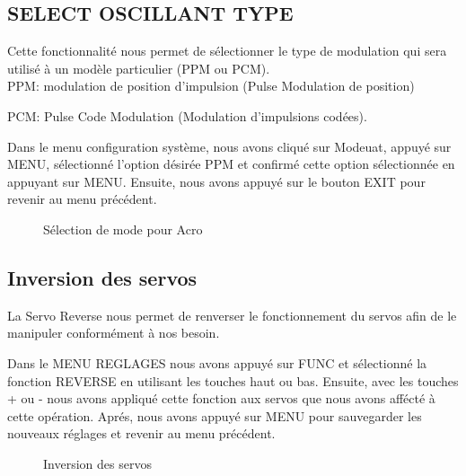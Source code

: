 \documentclass[a4paper,12pt]{book}
\begin{document}
\subsection{ SELECT OSCILLANT TYPE}
Cette fonctionnalité nous permet de sélectionner le type de modulation qui sera utilisé à un modèle particulier (PPM ou PCM).\\


PPM: modulation de position d'impulsion (Pulse Modulation de position) 

PCM: Pulse Code Modulation (Modulation d'impulsions codées).


Dans le menu configuration système, nous avons cliqué sur Modeuat, appuyé sur MENU, sélectionné l'option désirée PPM et confirmé cette option sélectionnée en appuyant sur MENU. Ensuite, nous avons appuyé sur le bouton EXIT pour revenir au menu précédent.

\begin{figure}[h]
	\begin{center}
		\centering
	\end{center}
	\caption{Sélection de mode pour Acro}
\end{figure}

\subsection{Inversion des servos}
La Servo Reverse nous permet de renverser le fonctionnement du servos afin de le manipuler conformément à nos besoin.


Dans le MENU REGLAGES nous avons appuyé sur FUNC et sélectionné la fonction REVERSE en utilisant les touches haut ou bas. Ensuite, avec les touches + ou -
nous avons appliqué cette fonction aux servos que nous avons affécté à cette opération. Aprés, nous avons appuyé sur MENU pour sauvegarder les nouveaux réglages et revenir au menu précédent.
\begin{figure}[h]
	\begin{center}
		\centering
	\end{center}
	\caption{Inversion des servos}
\end{figure}
\end{document}
